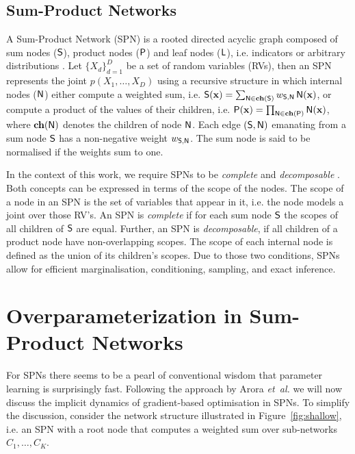 \documentclass{article}
\begin{document}
\subsection{Sum-Product Networks}
A Sum-Product Network (SPN) \cite{Poon2011a} is a rooted directed acyclic graph composed of sum nodes ($\mathsf{S}$), product nodes ($\mathsf{P}$) and leaf nodes ($\mathsf{L}$), i.e.  indicators or arbitrary distributions \cite{Peharz2015}.
Let $\{X_{d}\}_{d=1}^D$ be a set of random variables (RVs), then an SPN represents the joint $p(X_1, \dots, X_D)$ using a recursive structure in which internal nodes ($\mathsf{N}$) either compute a weighted sum, i.e. $\mathsf{S}(\mathbf{x}) = \sum_{\mathsf{N} \in \mathbf{ch}(\mathsf{S})} w_{\mathsf{S},\mathsf{N}} \, \mathsf{N}(\mathbf{x})$, 
or compute a product of the values of their children, i.e. $\mathsf{P}(\mathbf{x}) = \prod_{\mathsf{N} \in \mathbf{ch}(\mathsf{P})} \mathsf{N}(\mathbf{x})$,
where $\mathbf{ch}(\mathsf{N})$ denotes the children of node $\mathsf{N}$.
Each edge $(\mathsf{S},\mathsf{N})$ emanating from a sum node $\mathsf{S}$ has a non-negative weight $w_{\mathsf{S},\mathsf{N}}$. The sum node is said to be normalised if the weights sum to one.

In the context of this work, we require SPNs to be \emph{complete} and \emph{decomposable} \cite{Poon2011a,Darwiche2003}.
Both concepts can be expressed in terms of the scope of the nodes.
The scope of a node in an SPN is the set of variables that appear in it, i.e. the node models a joint over those RV's.
An SPN is \emph{complete} if for each sum node $\mathsf{S}$ the scopes of all children of $\mathsf{S}$ are equal.
Further, an SPN is \emph{decomposable}, if all children of a product node have non-overlapping scopes.
The scope of each internal node is defined as the union of its children's scopes.
Due to those two conditions, SPNs allow for efficient marginalisation, conditioning, sampling, and exact inference.

\section{Overparameterization in Sum-Product Networks} \label{sec:main}
For SPNs there seems to be a pearl of conventional wisdom that parameter learning is surprisingly fast.
Following the approach by Arora {\it et~al.} \cite{Arora2018} we will now discuss the implicit dynamics of gradient-based optimisation in SPNs.
To simplify the discussion, consider the network structure illustrated in Figure~\ref{fig:shallow}, i.e. an SPN with a root node that computes a weighted sum over sub-networks $C_1, \dots, C_K$.
\end{document}
